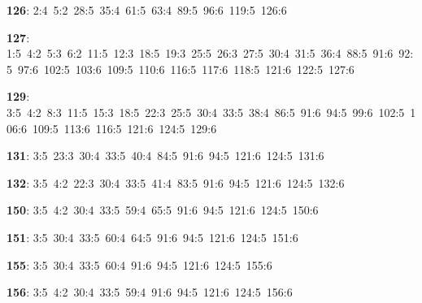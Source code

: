 \noindent \textbf{126}: 2:4\allowbreak\ 5:2\allowbreak\ 28:5\allowbreak\ 35:4\allowbreak\ 61:5\allowbreak\ 63:4\allowbreak\ 89:5\allowbreak\ 96:6\allowbreak\ 119:5\allowbreak\ 126:6\par
\noindent \textbf{127}: 1:5\allowbreak\ 4:2\allowbreak\ 5:3\allowbreak\ 6:2\allowbreak\ 11:5\allowbreak\ 12:3\allowbreak\ 18:5\allowbreak\ 19:3\allowbreak\ 25:5\allowbreak\ 26:3\allowbreak\ 27:5\allowbreak\ 30:4\allowbreak\ 31:5\allowbreak\ 36:4\allowbreak\ 88:5\allowbreak\ 91:6\allowbreak\ 92:5\allowbreak\ 97:6\allowbreak\ 102:5\allowbreak\ 103:6\allowbreak\ 109:5\allowbreak\ 110:6\allowbreak\ 116:5\allowbreak\ 117:6\allowbreak\ 118:5\allowbreak\ 121:6\allowbreak\ 122:5\allowbreak\ 127:6\par
\noindent \textbf{129}: 3:5\allowbreak\ 4:2\allowbreak\ 8:3\allowbreak\ 11:5\allowbreak\ 15:3\allowbreak\ 18:5\allowbreak\ 22:3\allowbreak\ 25:5\allowbreak\ 30:4\allowbreak\ 33:5\allowbreak\ 38:4\allowbreak\ 86:5\allowbreak\ 91:6\allowbreak\ 94:5\allowbreak\ 99:6\allowbreak\ 102:5\allowbreak\ 106:6\allowbreak\ 109:5\allowbreak\ 113:6\allowbreak\ 116:5\allowbreak\ 121:6\allowbreak\ 124:5\allowbreak\ 129:6\par
\noindent \textbf{131}: 3:5\allowbreak\ 23:3\allowbreak\ 30:4\allowbreak\ 33:5\allowbreak\ 40:4\allowbreak\ 84:5\allowbreak\ 91:6\allowbreak\ 94:5\allowbreak\ 121:6\allowbreak\ 124:5\allowbreak\ 131:6\par
\noindent \textbf{132}: 3:5\allowbreak\ 4:2\allowbreak\ 22:3\allowbreak\ 30:4\allowbreak\ 33:5\allowbreak\ 41:4\allowbreak\ 83:5\allowbreak\ 91:6\allowbreak\ 94:5\allowbreak\ 121:6\allowbreak\ 124:5\allowbreak\ 132:6\par
\noindent \textbf{150}: 3:5\allowbreak\ 4:2\allowbreak\ 30:4\allowbreak\ 33:5\allowbreak\ 59:4\allowbreak\ 65:5\allowbreak\ 91:6\allowbreak\ 94:5\allowbreak\ 121:6\allowbreak\ 124:5\allowbreak\ 150:6\par
\noindent \textbf{151}: 3:5\allowbreak\ 30:4\allowbreak\ 33:5\allowbreak\ 60:4\allowbreak\ 64:5\allowbreak\ 91:6\allowbreak\ 94:5\allowbreak\ 121:6\allowbreak\ 124:5\allowbreak\ 151:6\par
\noindent \textbf{155}: 3:5\allowbreak\ 30:4\allowbreak\ 33:5\allowbreak\ 60:4\allowbreak\ 91:6\allowbreak\ 94:5\allowbreak\ 121:6\allowbreak\ 124:5\allowbreak\ 155:6\par
\noindent \textbf{156}: 3:5\allowbreak\ 4:2\allowbreak\ 30:4\allowbreak\ 33:5\allowbreak\ 59:4\allowbreak\ 91:6\allowbreak\ 94:5\allowbreak\ 121:6\allowbreak\ 124:5\allowbreak\ 156:6\par
